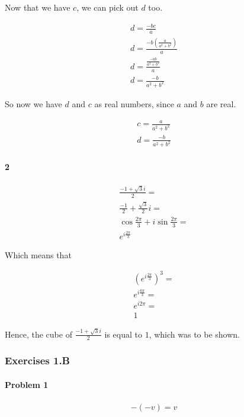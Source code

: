 Now that we have $c$, we can pick out $d$ too.

\begin{align*}
	d = \frac{-bc}{a} \\
	d = \frac{-b\left( \frac{a}{a^2+b^2} \right)}{a} \\
	d = \frac{\frac{-ab}{a^2+b^2}}{a} \\
	d = \frac{-b}{a^2+b^2}
\end{align*}

So now we have $d$ and $c$ as real numbers, since $a$ and $b$ are real.

\begin{align*}
	c = \frac{a}{a^2+b^2} \\
	d = \frac{-b}{a^2+b^2}
\end{align*}

\paragraph{2}

\begin{align*}
	\frac{-1+\sqrt{3}i}{2} = \\
	\frac{-1}{2} + \frac{\sqrt{3}}{2}i = \\
	\cos \frac{2\pi}{3} + i\sin \frac{2\pi}{3} = \\
	e^{i\frac{2\pi}{3}}
\end{align*}

Which means that 

\begin{align*}
	\left( e^{i\frac{2\pi}{3}} \right)^3 = \\
	e^{i\frac{6\pi}{3}} = \\
	e^{i2\pi} = \\
	1
\end{align*}

Hence, the cube of $\frac{-1+\sqrt{3}i}{2}$ is equal to $1$, which was to be shown.

\subsubsection{Exercises 1.B}

\paragraph{Problem 1}

\begin{align*}
	-(-v) = v \\
\end{align*}

